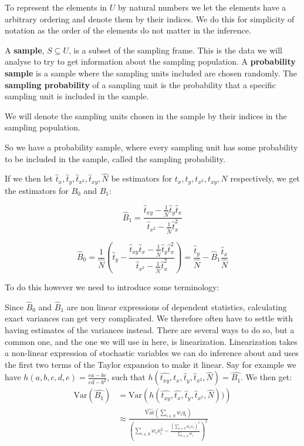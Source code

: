 \documentclass{article}
\begin{document}
To represent the elements in \(U\) by natural numbers we let the elements
have a arbitrary ordering and denote them by their indices. We do this for
simplicity of notation as the order of the elements do not matter in the inference.


\begin{definition} \label{def:sample}
A \textbf{sample}, \(S \subseteq U\), is a subset of the sampling frame. This is the data we will analyse to try to get information about the sampling population.
A \textbf{probability sample} is a sample where the sampling units included are chosen randomly.
The \textbf{sampling probability} of a sampling unit is the probability that a specific sampling unit is included in the sample.
\end{definition}

We will denote the sampling units chosen in the sample by their indices in the
sampling population.

So we have a probability sample, where every sampling unit has some probability to be included in the sample, called the sampling probability.

If we then let \(\hat{t}_x, \hat{t}_y, \hat{t}_{x^2}, \hat{t}_{xy}, \hat{N}\) be estimators
for \(t_x, t_y, t_{x^2},
t_{xy}, N\) respectively, we get the estimators for \(B_0\) and \(B_1\):

\begin{equation*}
  \hat{B}_1 = \frac{\hat{t}_{xy} - \frac{1}{\widehat{N}} \hat{t}_y \hat{t}_x}
    {\hat{t}_{x^2} - \frac{1}{\widehat{N}} \hat{t}_x^2}
\end{equation*}

\begin{equation*}
  \hat{B}_0 = \frac{1}{\widehat{N}} \left( \hat{t}_y - \frac{\hat{t}_{xy} \hat{t}_x - \frac{1}{\widehat{N}} \hat{t}_y \hat{t}_x^2}
    {\hat{t}_{x^2} - \frac{1}{\widehat{N}} \hat{t}_x^2}
  \right)
  = \frac{\hat{t}_y}{\hat{N}} - \hat{B}_1\frac{\hat{t}_x}{\hat{N}}
\end{equation*}

To do this however we need to introduce some terminology:

Since \(\hat{B}_0\) and \(\hat{B}_1\) are non linear expressions of dependent
statistics, calculating exact variances can get very complicated. We therefore
often have to settle with having estimates of the variances instead.
There are several ways to do so, but a common one,
and the one we will use in here, is linearization. Linearization takes a
non-linear expression of stochastic variables we can do inference about and uses
the first two terms of the Taylor expansion to make it linear.
Say for example we have \(h(a, b, c, d, e) = \frac{ea - bc}{ed - b^2}\), such that
\(h(\hat{t_{xy}}, \hat{t_x}, \hat{t}_y, \hat{t}_{x^2}, \hat{N}) = \hat{B_1}\).
We then get:
\begin{align*}
  \mathrm{Var}(\hat{B_1})
  &= \mathrm{Var} \left( h(\hat{t_{xy}}, \hat{t_x},
  \hat{t}_y, \hat{t}_{x^2}, \hat{N})) \right) \\
  &\approx \frac{\widehat{\mathrm{Var}}\left( \sum_{i \in S} w_i q_i \right)}
    {\left( \sum_{i \in S} w_i x_i^2 - \frac{\left( \sum_{i \in S} w_i x_i \right)^2}{\sum_{i \in S} w_i} \right)^2}
\end{align*}
\end{document}

